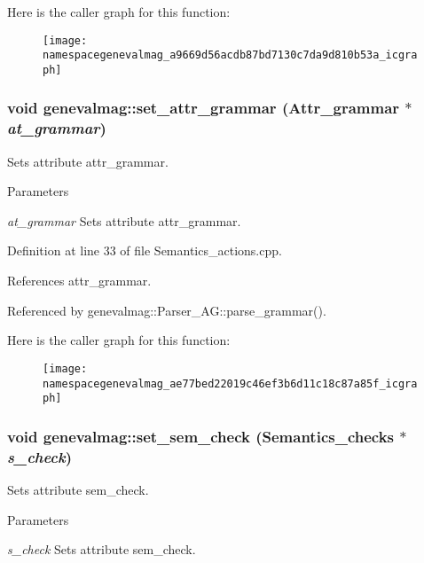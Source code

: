 Here is the caller graph for this function:\nopagebreak
\begin{figure}[H]
\begin{center}
\leavevmode
\texttt{[image: namespacegenevalmag\_a9669d56acdb87bd7130c7da9d810b53a\_icgraph]}
\end{center}
\end{figure}


\hypertarget{namespacegenevalmag_ae77bed22019c46ef3b6d11c18c87a85f}{
\subsubsection[{set\_\-attr\_\-grammar}]{\setlength{\rightskip}{0pt plus 5cm}void genevalmag::set\_\-attr\_\-grammar (Attr\_\-grammar $\ast$ {\em at\_\-grammar})}}
\label{namespacegenevalmag_ae77bed22019c46ef3b6d11c18c87a85f}
Sets attribute attr\_\-grammar. 
\begin{DoxyParams}{Parameters}
\item[{\em at\_\-grammar}]Sets attribute attr\_\-grammar. \end{DoxyParams}


Definition at line 33 of file Semantics\_\-actions.cpp.



References attr\_\-grammar.



Referenced by genevalmag::Parser\_\-AG::parse\_\-grammar().



Here is the caller graph for this function:\nopagebreak
\begin{figure}[H]
\begin{center}
\leavevmode
\texttt{[image: namespacegenevalmag\_ae77bed22019c46ef3b6d11c18c87a85f\_icgraph]}
\end{center}
\end{figure}


\hypertarget{namespacegenevalmag_ab68c3ea3b4064fbd96451dd2a094ad34}{
\subsubsection[{set\_\-sem\_\-check}]{\setlength{\rightskip}{0pt plus 5cm}void genevalmag::set\_\-sem\_\-check (Semantics\_\-checks $\ast$ {\em s\_\-check})}}
\label{namespacegenevalmag_ab68c3ea3b4064fbd96451dd2a094ad34}
Sets attribute sem\_\-check. 
\begin{DoxyParams}{Parameters}
\item[{\em s\_\-check}]Sets attribute sem\_\-check. \end{DoxyParams}


